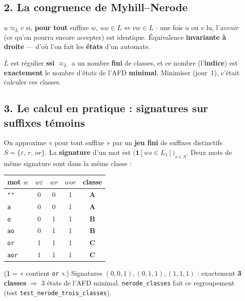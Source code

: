 \documentclass[11pt,a4paper]{scrartcl}
\begin{document}
\subsection*{2. La congruence de Myhill--Nerode}
$u\approx_{L}v$ si, \textbf{pour tout} suffixe $w$, $uw\in L\Leftrightarrow vw\in L$ :
une fois $u$ ou $v$ lu, l'\emph{avenir} (ce qu'on pourra encore accepter) est identique.
Équivalence \textbf{invariante à droite} — d'où l'on fait les \textbf{états} d'un automate.

\begin{notion}
$L$ est régulier \textbf{ssi} $\approx_{L}$ a un nombre \textbf{fini} de classes, et ce
nombre (l'\textbf{indice}) est \textbf{exactement} le nombre d'états de l'AFD
\textbf{minimal}. Minimiser (jour~1), c'était calculer ces classes.
\end{notion}

\subsection*{3. Le calcul en pratique : signatures sur suffixes témoins}
On approxime « pour tout suffixe » par un \textbf{jeu fini} de suffixes distinctifs
$S=\{\varepsilon,\,r,\,or\}$. La \textbf{signature} d'un mot est
$\big(\mathbf{1}[w s\in L_1]\big)_{s\in S}$. Deux mots de même signature sont dans la même
classe :

\begin{exemple}[Trois signatures = trois classes]
\begin{center}\small
\begin{tabular}{@{}lccc>{\bfseries}c@{}}
\toprule
mot $w$ & $w\varepsilon$ & $wr$ & $wor$ & classe\\\midrule
\texttt{""}  & 0 & 0 & 1 & A\\
\texttt{a}   & 0 & 0 & 1 & A\\
\texttt{o}   & 0 & 1 & 1 & B\\
\texttt{ao}  & 0 & 1 & 1 & B\\
\texttt{or}  & 1 & 1 & 1 & C\\
\texttt{aor} & 1 & 1 & 1 & C\\
\bottomrule
\end{tabular}
\end{center}
(\texttt{1} = « contient \texttt{or} ».) Signatures $(0,0,1),(0,1,1),(1,1,1)$ : exactement
\textbf{3 classes} $\Rightarrow$ 3 états de l'AFD minimal. \texttt{nerode\_classes} fait
ce regroupement (test \texttt{test\_nerode\_trois\_classes}).
\end{exemple}
\end{document}
